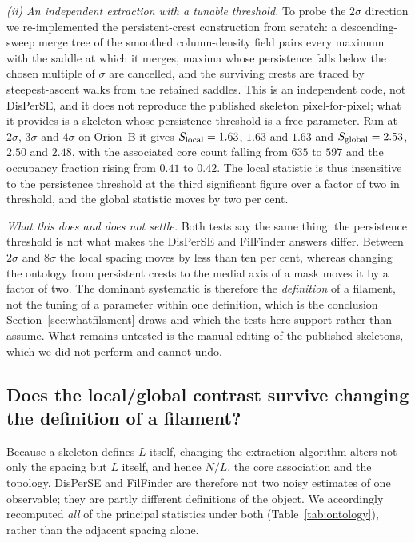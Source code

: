 \documentclass[usenatbib,twoside,twocolumn]{mnras}
\begin{document}
\smallskip\noindent\emph{(ii) An independent extraction with a tunable threshold.} To probe the $2\sigma$ direction we re-implemented the persistent-crest construction from scratch: a descending-sweep merge tree of the smoothed column-density field pairs every maximum with the saddle at which it merges, maxima whose persistence falls below the chosen multiple of $\sigma$ are cancelled, and the surviving crests are traced by steepest-ascent walks from the retained saddles. This is an independent code, not DisPerSE, and it does not reproduce the published skeleton pixel-for-pixel; what it provides is a skeleton whose persistence threshold is a free parameter. Run at $2\sigma$, $3\sigma$ and $4\sigma$ on Orion~B it gives $S_{\rm local}=1.63$, $1.63$ and $1.63$ and $S_{\rm global}=2.53$, $2.50$ and $2.48$, with the associated core count falling from $635$ to $597$ and the occupancy fraction rising from $0.41$ to $0.42$. The local statistic is thus insensitive to the persistence threshold at the third significant figure over a factor of two in threshold, and the global statistic moves by two per cent.

\smallskip\noindent\emph{What this does and does not settle.} Both tests say the same thing: the persistence threshold is not what makes the DisPerSE and FilFinder answers differ. Between $2\sigma$ and $8\sigma$ the local spacing moves by less than ten per cent, whereas changing the ontology from persistent crests to the medial axis of a mask moves it by a factor of two. The dominant systematic is therefore the \emph{definition} of a filament, not the tuning of a parameter within one definition, which is the conclusion Section~\ref{sec:whatfilament} draws and which the tests here support rather than assume. What remains untested is the manual editing of the published skeletons, which we did not perform and cannot undo.

\subsection{Does the local/global contrast survive changing the definition of a filament?}
\label{sec:ontology}
Because a skeleton defines $L$ itself, changing the extraction algorithm alters not only the spacing but $L$ itself, and hence $N/L$, the core association and the topology. DisPerSE and FilFinder are therefore not two noisy estimates of one observable; they are partly different definitions of the object. We accordingly recomputed \emph{all} of the principal statistics under both (Table~\ref{tab:ontology}), rather than the adjacent spacing alone.
\end{document}
